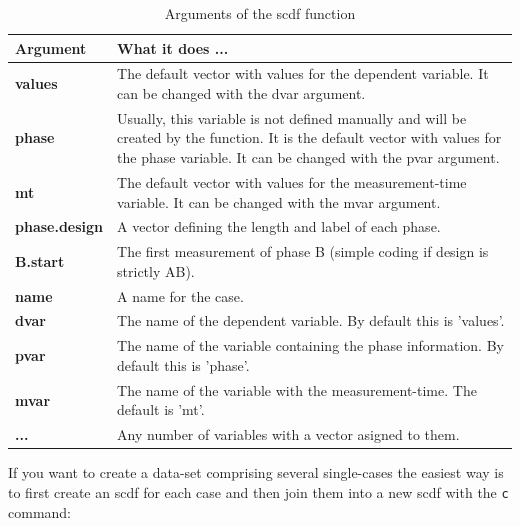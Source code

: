 \documentclass[
]{book}
\begin{document}
\begin{table}

\caption{\label{tab:table-scdf}Arguments of the scdf function}
\begin{tabular}[t]{>{\raggedright\arraybackslash}p{15em}>{\raggedright\arraybackslash}p{30em}}
\toprule
Argument & What it does ...\\
\midrule
\textbf{values} & The default vector with values for the dependent variable. It can be changed with the dvar argument.\\
\textbf{phase} & Usually, this variable is not defined manually and will be created by the function. It is the default vector with values for the phase variable. It can be changed with the pvar argument.\\
\textbf{mt} & The default vector with values for the measurement-time variable. It can be changed with the mvar argument.\\
\textbf{phase.design} & A vector defining the length and label of each phase.\\
\textbf{B.start} & The first measurement of phase B (simple coding if design is strictly AB).\\
\textbf{name} & A name for the case.\\
\textbf{dvar} & The name of the dependent variable. By default this is 'values'.\\
\textbf{pvar} & The name of the variable containing the phase information. By default this is 'phase'.\\
\textbf{mvar} & The name of the variable with the measurement-time. The default is 'mt'.\\
\textbf{...} & Any number of variables with a vector asigned to them.\\
\bottomrule
\end{tabular}
\end{table}

If you want to create a data-set comprising several single-cases the easiest way is to first create an scdf for each case and then join them into a new scdf with the \texttt{c} command:
\end{document}
